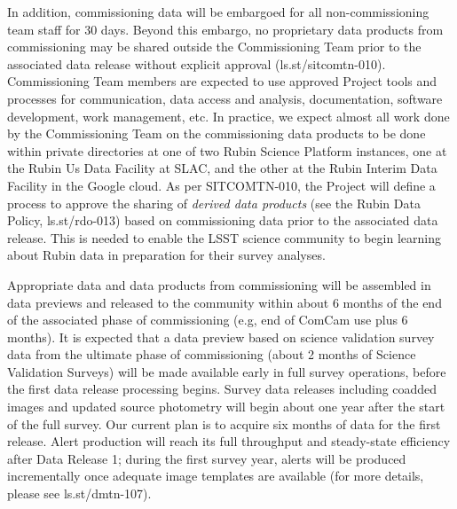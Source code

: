 In addition, commissioning data will be embargoed for all non-commissioning team staff for 30 days. 
Beyond this embargo, no proprietary data products from commissioning may be shared outside the Commissioning Team prior to the associated data release without explicit approval (ls.st/sitcomtn-010). 
Commissioning Team members are expected to use approved Project tools and processes for communication, data access and analysis, documentation, software development, work management, etc.
In practice, we expect almost all work done by the Commissioning Team on the commissioning data products to be done within private directories at one of two Rubin Science Platform instances, one at the Rubin Us Data Facility at SLAC, and the other at the Rubin Interim Data Facility in the Google cloud.
As per SITCOMTN-010, the Project will define a process to approve the sharing of {\it derived data products} (see the Rubin Data Policy, ls.st/rdo-013) based on commissioning data prior to the associated data release.
This is needed to enable the LSST science community to begin learning about Rubin data in preparation for their survey analyses. 

Appropriate data and data products from commissioning will be assembled in data previews  and released to the community within about 6 months of the end of the associated phase of commissioning (e.g, end of ComCam use plus 6 months).
It is expected that a data preview based on science validation survey data from the ultimate phase of commissioning (about 2 months of Science Validation Surveys) will be made available early in full survey operations, before the first data release processing begins.
Survey data releases including coadded images and updated source photometry will begin about one year after the start of the full survey. 
Our current plan is to acquire six months of data for the first release.
Alert production will reach its full throughput and steady-state efficiency after Data Release 1; during the first survey year, alerts will be produced incrementally once adequate image templates are available (for more details, please see ls.st/dmtn-107). 
